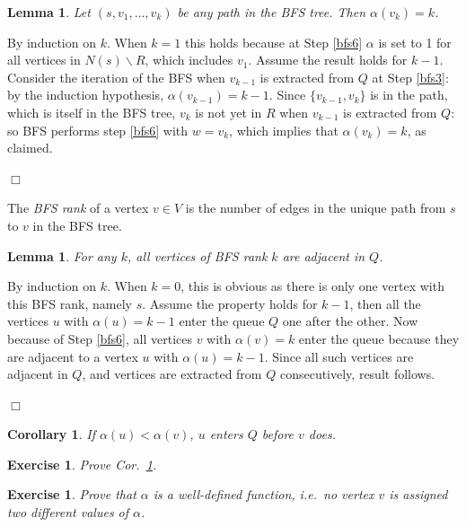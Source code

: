 \documentclass[a4paper]{book}
\theoremstyle{changebreak}                %
\newtheorem{lem}[result]{Lemma}
\newtheorem{cor}[result]{Corollary}
\newtheorem{ex}[result]{Exercise}
\newenvironment{proof}
 {{\sl Proof.}\hspace*{1 ex}}%
 {{\nopagebreak\hspace*{\fill}$\Box$\par\vspace{12pt}}}
\begin{document}
\begin{lem}
Let $(s,v_1,\ldots,v_k)$ be any path in the BFS tree. Then
$\alpha(v_k)=k$. \label{lem:alpha}
\end{lem}
\begin{proof}
By induction on $k$. When $k=1$ this holds because at Step \ref{bfs6}
$\alpha$ is set to 1 for all vertices in $N(s)\smallsetminus R$, which
includes $v_1$. Assume the result holds for $k-1$. Consider the
iteration of the BFS when $v_{k-1}$ is extracted from $Q$ at Step
\ref{bfs3}: by the induction hypothesis, $\alpha(v_{k-1})=k-1$. Since
$\{v_{k-1},v_k\}$ is in the path, which is itself in the BFS tree,
$v_k$ is not yet in $R$ when $v_{k-1}$ is extracted from $Q$: so BFS
performs step \ref{bfs6} with $w=v_k$, which implies that
$\alpha(v_k)=k$, as claimed.
\end{proof}

The {\it BFS rank} of a vertex
$v\in V$ is the number of edges in the unique path from $s$ to $v$ in
the BFS tree.
\begin{lem}
For any $k$, all vertices of BFS rank $k$ are adjacent in $Q$.
\end{lem}
\begin{proof}
By induction on $k$. When $k=0$, this is obvious as there is only one
vertex with this BFS rank, namely $s$. Assume the property holds for
$k-1$, then all the vertices $u$ with $\alpha(u)=k-1$ enter the queue
$Q$ one after the other. Now because of Step \ref{bfs6}, all vertices
$v$ with $\alpha(v)=k$ enter the queue because they are adjacent to a
vertex $u$ with $\alpha(u)=k-1$. Since all such vertices are adjacent
in $Q$, and vertices are extracted from $Q$ consecutively, result
follows.
\end{proof}

\begin{cor}
If $\alpha(u)<\alpha(v)$, $u$ enters $Q$ before $v$ does.
\label{cor:ultv}
\end{cor}
\begin{ex}
Prove Cor.~\ref{cor:ultv}.
\end{ex}

\begin{ex}
Prove that $\alpha$ is a well-defined function, i.e.~no vertex $v$ is
assigned two different values of $\alpha$.
\end{ex}
\end{document}
